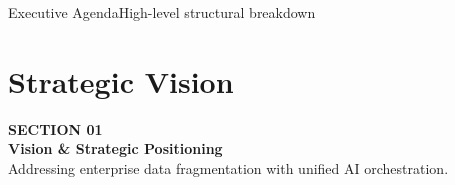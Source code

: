 \documentclass[aspectratio=169, 10pt]{beamer}
\begin{document}
\begin{frame}[label=agenda]{Executive Agenda}{High-level structural breakdown}
  \tableofcontents
\end{frame}

\section{Strategic Vision}
\label{sec:vision}

\begin{frame}
  \vfill
  \begin{tcolorbox}[
    enhanced,
    colback=NavyDark,
    colframe=RoyalAccent,
    boxrule=2pt,
    arc=6pt,
    top=14pt, bottom=14pt, left=14pt
  ]
    {\large\color{SkyAccent}\bfseries SECTION 01}\\[4pt]
    {\huge\bfseries\color{white} Vision \& Strategic Positioning}\\[6pt]
    {\small\color{PageBg!80!white} Addressing enterprise data fragmentation with unified AI orchestration.}
  \end{tcolorbox}
  \vfill
\end{frame}

\end{document}
